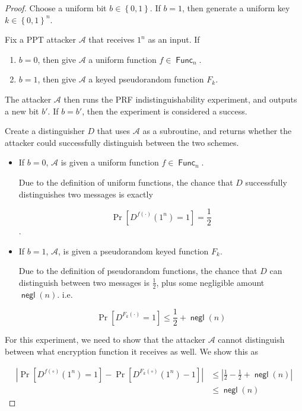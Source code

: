 \documentclass{article}
\DeclareMathOperator{\Func}{\textsf{Func}}
\DeclareMathOperator{\negl}{\textsf{negl}}
\begin{document}
\begin{enumerate}
    \begin{proof}
      Choose a uniform bit $b \in \left\{0, 1\right\}$. If $b = 1$, then
      generate a uniform key $k \in \left\{0, 1\right\}^n$.

      Fix a PPT attacker $\mathcal{A}$ that receives $1^n$ as an input. If
      \begin{enumerate}
        \item $b = 0$, then give $\mathcal{A}$ a uniform function $f \in
          \Func_n$.
        \item $b = 1$, then give $\mathcal{A}$ a keyed pseudorandom function
          $F_k$.
      \end{enumerate}

      The attacker $\mathcal{A}$ then runs the PRF indistinguishability
      experiment, and outputs a new bit $b'$. If $b = b'$, then the experiment
      is considered a success.

      Create a distinguisher $D$ that uses $\mathcal{A}$ as a subroutine, and
      returns whether the attacker could successfully distinguish between the
      two schemes.

      \begin{itemize}
        \item If $b = 0$, $\mathcal{A}$ is given a uniform function $f \in \Func_n$.

          Due to the definition of uniform functions, the chance that
          $D$ successfully distinguishes two messages is exactly

          \[
            \Pr \left[D^{f(\cdot)}(1^n) = 1\right] = \frac{1}{2}
          \].

        \item If $b = 1$, $\mathcal{A}$, is given a pseudorandom keyed function
          $F_k$.

          Due to the definition of pseudorandom functions, the chance that
          $D$ can distinguish between two messages is
          $\frac{1}{2}$, plus some negligible amount $\negl(n)$. i.e.

          \[
            \Pr \left[D^{F_k(\cdot)} = 1\right] \leq \frac{1}{2} + \negl(n)
          \]
      \end{itemize}

      For this experiment, we need to show that the attacker $\mathcal{A}$
      cannot distinguish between what encryption function it receives as well.
      We show this as

      \begin{align*}
        \left| \Pr \left[D^{f(\circ)}(1^n) = 1\right] - \Pr
        \left[D^{F_k(\circ)}(1^n) - 1\right]\right| &\leq \left| \frac{1}{2} -
        \frac{1}{2} + \negl(n) \right|\\
                                                    &\leq \negl(n)
      \end{align*}


\end{proof}
\end{enumerate}
\end{document}
